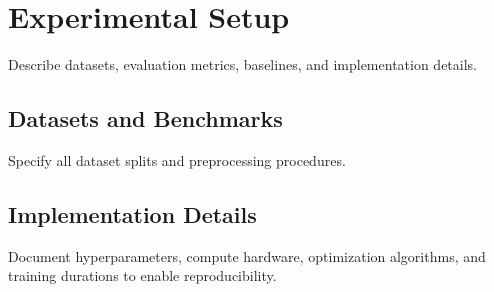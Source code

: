 \section{Experimental Setup}
\label{sec:experiments}

Describe datasets, evaluation metrics, baselines, and implementation details.

\subsection{Datasets and Benchmarks}
Specify all dataset splits and preprocessing procedures.

\subsection{Implementation Details}
Document hyperparameters, compute hardware, optimization algorithms, and training durations to enable reproducibility.
